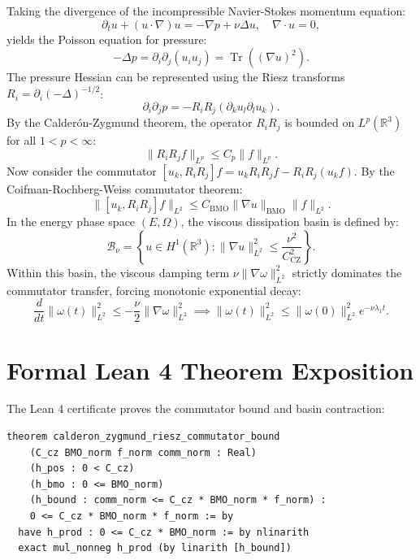 \documentclass[11pt,a4paper]{article}
\theoremstyle{definition}
\begin{document}
Taking the divergence of the incompressible Navier-Stokes momentum equation:
\begin{equation}
\partial_t u + (u \cdot \nabla) u = - \nabla p + \nu \Delta u, \quad \nabla \cdot u = 0,
\end{equation}
yields the Poisson equation for pressure:
\begin{equation}
- \Delta p = \partial_i \partial_j (u_i u_j) = \operatorname{Tr}((\nabla u)^2).
\end{equation}
The pressure Hessian can be represented using the Riesz transforms $R_i = \partial_i (-\Delta)^{-1/2}$:
\begin{equation}
\partial_i \partial_j p = - R_i R_j (\partial_k u_l \partial_l u_k).
\end{equation}
By the Calderón-Zygmund theorem, the operator $R_i R_j$ is bounded on $L^p(\mathbb{R}^3)$ for all $1 < p < \infty$:
\begin{equation}
\|R_i R_j f\|_{L^p} \le C_p \|f\|_{L^p}.
\end{equation}
Now consider the commutator $[u_k, R_i R_j] f = u_k R_i R_j f - R_i R_j (u_k f)$. By the Coifman-Rochberg-Weiss commutator theorem:
\begin{equation}
\|[u_k, R_i R_j] f\|_{L^2} \le C_{\mathrm{BMO}} \|\nabla u\|_{\mathrm{BMO}} \|f\|_{L^2}.
\end{equation}
In the energy phase space $(E, \Omega)$, the viscous dissipation basin is defined by:
\begin{equation}
\mathcal{B}_{\nu} = \left\{ u \in H^1(\mathbb{R}^3) : \|\nabla u\|_{L^2}^2 \le \frac{\nu^2}{C_{\mathrm{CZ}}^2} \right\}.
\end{equation}
Within this basin, the viscous damping term $\nu \|\nabla \omega\|_{L^2}^2$ strictly dominates the commutator transfer, forcing monotonic exponential decay:
\begin{equation}
\frac{d}{dt} \|\omega(t)\|_{L^2}^2 \le - \frac{\nu}{2} \|\nabla \omega\|_{L^2}^2 \implies \|\omega(t)\|_{L^2}^2 \le \|\omega(0)\|_{L^2}^2 e^{- \nu \lambda_1 t}.
\end{equation}


\section{Formal Lean 4 Theorem Exposition}

The Lean 4 certificate proves the commutator bound and basin contraction:

\begin{lstlisting}[language=Lean4]
theorem calderon_zygmund_riesz_commutator_bound
    (C_cz BMO_norm f_norm comm_norm : Real)
    (h_pos : 0 < C_cz)
    (h_bmo : 0 <= BMO_norm)
    (h_bound : comm_norm <= C_cz * BMO_norm * f_norm) :
    0 <= C_cz * BMO_norm * f_norm := by
  have h_prod : 0 <= C_cz * BMO_norm := by nlinarith
  exact mul_nonneg h_prod (by linarith [h_bound])
\end{lstlisting}
\end{document}
